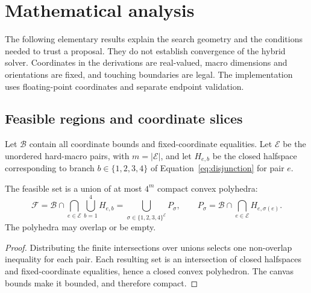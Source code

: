 \section{Mathematical analysis}\label{sec:mechanisms}

The following elementary results explain the search geometry and the conditions
needed to trust a proposal. They do not establish convergence of the hybrid
solver. Coordinates in the derivations are real-valued, macro dimensions and
orientations are fixed, and touching boundaries are legal. The implementation
uses floating-point coordinates and separate endpoint validation.

\subsection{Feasible regions and coordinate slices}\label{sec:geometry-analysis}

Let $\mathcal B$ contain all coordinate bounds and fixed-coordinate equalities.
Let $\mathcal E$ be the unordered hard-macro pairs, with
$m=|\mathcal E|$, and let $H_{e,b}$ be the closed halfspace corresponding to
branch $b\in\{1,2,3,4\}$ of Equation~\eqref{eq:disjunction} for pair $e$.

\begin{proposition}\label{prop:geometry}
The feasible set is a union of at most $4^m$ compact convex polyhedra:
\begin{equation}
 \mathcal F
 =\mathcal B\cap\bigcap_{e\in\mathcal E}\bigcup_{b=1}^4 H_{e,b}
 =\bigcup_{\sigma\in\{1,2,3,4\}^{\mathcal E}} P_\sigma,
 \qquad
 P_\sigma=\mathcal B\cap\bigcap_{e\in\mathcal E}H_{e,\sigma(e)}.
 \label{eq:polyhedral-union}
\end{equation}
The polyhedra may overlap or be empty.
\end{proposition}
\begin{proof}
Distributing the finite intersections over unions selects one non-overlap
inequality for each pair. Each resulting set is an intersection of closed
halfspaces and fixed-coordinate equalities, hence a closed convex polyhedron.
The canvas bounds make it bounded, and therefore compact.
\end{proof}

